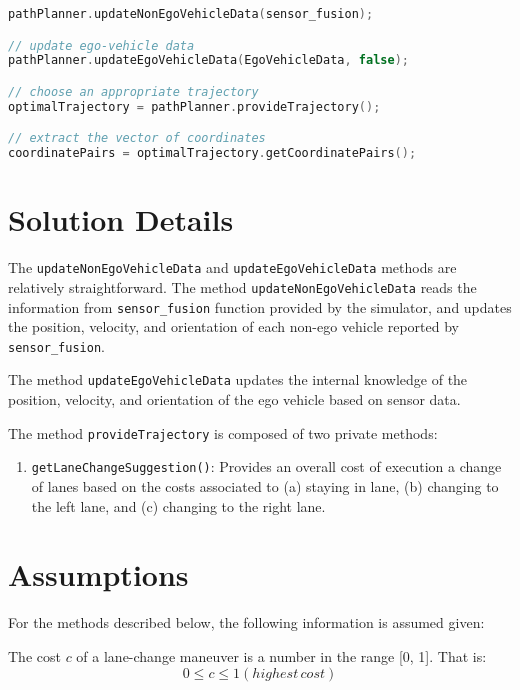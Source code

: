 \documentclass{article}
\begin{document}
{
    \begin{lstlisting}[language=C++]
pathPlanner.updateNonEgoVehicleData(sensor_fusion);

// update ego-vehicle data
pathPlanner.updateEgoVehicleData(EgoVehicleData, false);

// choose an appropriate trajectory
optimalTrajectory = pathPlanner.provideTrajectory();

// extract the vector of coordinates
coordinatePairs = optimalTrajectory.getCoordinatePairs();
    \end{lstlisting}
}

\section{Solution Details}

The \texttt{updateNonEgoVehicleData} and \texttt{updateEgoVehicleData} methods are relatively straightforward. 
The method \texttt{updateNonEgoVehicleData} reads the information from \texttt{sensor\_fusion} function provided by the simulator, and updates the position, velocity, and orientation of each non-ego vehicle reported by \texttt{sensor\_fusion}. 

The method \texttt{updateEgoVehicleData} updates the internal knowledge of the position, velocity, and orientation of the ego vehicle based on sensor data.

The method \texttt{provideTrajectory} is composed of two private methods:
\begin{enumerate}
    \item \texttt{getLaneChangeSuggestion()}: Provides an overall cost of execution a change of lanes based on the costs associated to (a) staying in lane, (b) changing to the left lane, and (c) changing to the right lane. 
\end{enumerate}

\section{Assumptions}
For the methods described below, the following information is assumed given:

The cost $ c $ of a lane-change maneuver is a number in the range [0, 1]. That is:
\begin{equation}
0 \leq c \leq 1 (highest \,cost)
\end{equation}
\end{document}
